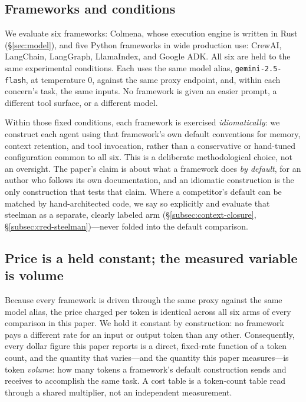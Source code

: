 \subsection{Frameworks and conditions}
\label{subsec:method-frameworks}

We evaluate six frameworks: Colmena, whose execution engine is written in
Rust (\S\ref{sec:model}), and five Python frameworks in wide production
use: CrewAI, LangChain, LangGraph, LlamaIndex, and Google ADK. All six are
held to the same experimental conditions. Each uses the same model alias,
\texttt{gemini-2.5-flash}, at temperature $0$, against the same proxy
endpoint, and, within each concern's task, the same inputs. No framework
is given an easier prompt, a different tool surface, or a different
model.

Within those fixed conditions, each framework is exercised
\emph{idiomatically}: we construct each agent using that framework's own
default conventions for memory, context retention, and tool invocation,
rather than a conservative or hand-tuned configuration common to all six.
This is a deliberate methodological choice, not an oversight. The paper's
claim is about what a framework does \emph{by default}, for an author who
follows its own documentation, and an idiomatic construction is the only
construction that tests that claim. Where a competitor's default can be
matched by hand-architected code, we say so explicitly and evaluate that
steelman as a separate, clearly labeled arm (\S\ref{subsec:context-closure},
\S\ref{subsec:cred-steelman})---never folded into the default comparison.

\subsection{Price is a held constant; the measured variable is volume}
\label{subsec:method-price}

Because every framework is driven through the same proxy against the same
model alias, the price charged per token is identical across all six
arms of every comparison in this paper. We hold it constant by
construction: no framework pays a different rate for an input or output
token than any other. Consequently, every dollar figure this paper reports
is a direct, fixed-rate function of a token count, and the quantity that
varies---and the quantity this paper measures---is token \emph{volume}:
how many tokens a framework's default construction sends and receives to
accomplish the same task. A cost table is a token-count table read through
a shared multiplier, not an independent measurement.

